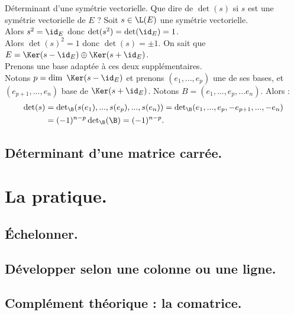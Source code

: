 \documentclass[11pt]{article}
\begin{document}
\begin{ex}{Déterminant d'une symétrie vectorielle.}{}
    Que dire de $\det(s)$ si $s$ est une symétrie vectorielle de $E$ ?
    \tcblower
    Soit $s\in\L(E)$ une symétrie vectorielle.\\
    Alors $s^2=\id_E$ donc $\det(s^2)=\det(\id_E)=1$.\\
    Alors $\det(s)^2=1$ donc $\det(s)=\pm1$.\n
    On sait que $E=\Ker(s-\id_E)\oplus\Ker(s+\id_E)$.\\
    Prenons une base adaptée à ces deux supplémentaires.\\
    Notons $p=\dim~\Ker(s-\id_E)$ et prenons $(e_1,...,e_p)$ une de ses bases, et $(e_{p+1},...,e_n)$ base de $\Ker(s+\id_E)$.\n
    Notons $B=(e_1,...,e_p,...e_n)$. Alors :
    \begin{align*}
        \det(s)&=\det\nolimits_{\B}(s(e_1),...,s(e_p),...,s(e_n))
        =\det\nolimits_{\B}(e_1,...,e_p,-e_{p+1},...,-e_n)\\
        &=(-1)^{n-p}\det\nolimits_{\B}(\B)
        =(-1)^{n-p}.
    \end{align*}
\end{ex}

\subsection{Déterminant d'une matrice carrée.}

\section{La pratique.}

\subsection{Échelonner.}
\subsection{Développer selon une colonne ou une ligne.}
\subsection{Complément théorique : la comatrice.}
\end{document}
